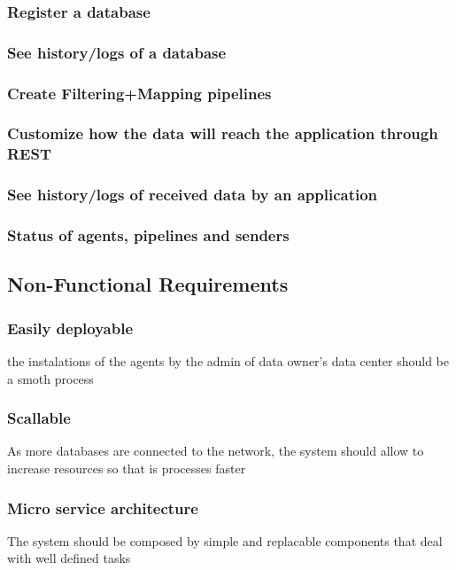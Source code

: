 \subsubsection*{Register a database}
\subsubsection*{See history/logs of a database}
\subsubsection*{Create Filtering+Mapping pipelines}
\subsubsection*{Customize how the data will reach the application through REST}
\subsubsection*{See history/logs of received data by an application}
\subsubsection*{Status of agents, pipelines and senders}

\subsection{Non-Functional Requirements}

\subsubsection*{Easily deployable}
the instalations of the agents by the admin of data owner's data center should be a smoth process

\subsubsection*{Scallable}
As more databases are connected to the network, the system should allow to increase resources so that is processes faster

\subsubsection*{Micro service architecture}
The system should be composed by simple and replacable components that deal with well defined tasks

